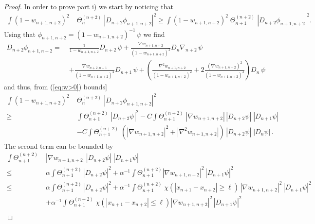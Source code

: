 \documentclass[11pt]{article}
\renewcommand{\a}{\alpha}
\begin{document}
\begin{proof}
In order to prove part i) we start by noticing that
\begin{equation}
\begin{split}
\int (1-w_{n+1,n+2})^2 \; &\Theta^{(n+2)}_n \; |D_{n+2}
\phi_{n+1,n+2}|^2 \geq \int (1-w_{n+1,n+2})^2 \;
\Theta^{(n+2)}_{n+1} \; |D_{n+2} \phi_{n+1,n+2}|^2.
\end{split}
\end{equation}
Using that $\phi_{n+1, n+2}=(1-w_{n+1, n+2})^{-1} \, \psi$ we find
\begin{equation*} \begin{split} D_{n+2}
\phi_{n+1,n+2} = \; & \frac{1}{1-w_{n+1,n+2}} D_{n+2}
\, \psi + \frac{\nabla w_{n+1,n+2}}{(1-w_{n+1,n+2})^2}
D_n\nabla_{n+2} \, \psi  \\ & + \frac{\nabla
w_{n+2,n+1}}{(1-w_{n+1,n+2})^2} D_{n+1} \, \psi +
\left(\frac{\nabla^2 w_{n+1,n+2}}{(1-w_{n+1,n+2})^2} + 2
\frac{(\nabla w_{n+1,n+2})^2}{(1-w_{n+1,n+2})^3} \right) D_n \, \psi
\end{split}
\end{equation*}
and thus,  from (\ref{eq:w>0})
bounds]
\begin{equation}\label{eq:Hk-10}
\begin{split}
\int (1-w_{n+1,n+2})^2 \; &\Theta^{(n+2)}_n \; | D_{n+2}
\phi_{n+1,n+2}|^2 \\ \geq \; &\int \Theta^{(n+2)}_{n+1} \;
|D_{n+2}\psi|^2 - C \int \Theta^{(n+2)}_{n+1} \; |\nabla
w_{n+1,n+2}| \, |D_{n+2}\psi| \; |D_{n+1} \psi|
\\ &-C \int \Theta^{(n+2)}_{n+1}
\;\left( |\nabla w_{n+1,n+2}|^2 + |\nabla^2 w_{n+1,n+2}|\right) \,
|D_{n+2}\psi| \; |D_n \psi| \,.
\end{split}
\end{equation}
The second term can be bounded by
\begin{equation}
\begin{split}
\int \Theta^{(n+2)}_{n+1} \;& |\nabla w_{n+1,n+2}| \, |D_{n+2}\psi|
\; |D_{n+1} \psi|
\\ \leq \; & \a \int \Theta^{(n+2)}_{n+1} \, |D_{n+2}\psi|^2 +
\a^{-1} \int \Theta^{(n+2)}_{n+1} |\nabla w_{n+1,n+2}|^2 \, |D_{n+1}
\psi|^2
\\ \leq \; & \a \int \Theta^{(n+2)}_{n+1} \, |D_{n+2}\psi|^2 +
\a^{-1} \int \Theta^{(n+2)}_{n+1} \; \chi (|x_{n+1} - x_{n+2}| \geq
\ell) \, |\nabla w_{n+1,n+2}|^2 \, |D_{n+1} \psi|^2 \\
&+ \a^{-1} \int \Theta^{(n+2)}_{n+1} \; \chi (|x_{n+1} - x_{n+2}|
\leq \ell) |\nabla w_{n+1,n+2}|^2 \, |D_{n+1}\psi|^2 \\

\end{split}
\end{equation}
\end{proof}
\end{document}
